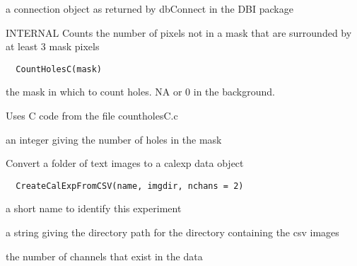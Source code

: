 \documentclass[a4paper]{book}
\begin{document}
%
\begin{Value}
a connection object as returned by dbConnect in the DBI
package
\end{Value}
%
\begin{Description}\relax
INTERNAL Counts the number of pixels not in a mask that
are surrounded by at least 3 mask pixels
\end{Description}
%
\begin{Usage}
\begin{verbatim}
  CountHolesC(mask)
\end{verbatim}
\end{Usage}
%
\begin{Arguments}
\begin{ldescription}
\item[\code{mask}] the mask in which to count holes.  NA or 0 in
the background.
\end{ldescription}
\end{Arguments}
%
\begin{Details}\relax
Uses C code from the file countholesC.c
\end{Details}
%
\begin{Value}
an integer giving the number of holes in the mask
\end{Value}
%
\begin{Description}\relax
Convert a folder of text images to a calexp data object
\end{Description}
%
\begin{Usage}
\begin{verbatim}
  CreateCalExpFromCSV(name, imgdir, nchans = 2)
\end{verbatim}
\end{Usage}
%
\begin{Arguments}
\begin{ldescription}
\item[\code{name}] a short name to identify this experiment

\item[\code{imgdir}] a string giving the directory path for the
directory containing the csv images

\item[\code{nchans}] the number of channels that exist in the
data
\end{ldescription}
\end{Arguments}
\end{document}
